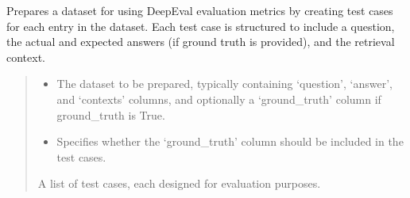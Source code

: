 \documentclass[letterpaper,10pt,english,openany,oneside]{sphinxmanual}
\begin{document}
\begin{fulllineitems}
\label{\detokenize{evaluation:tools.pipeline.deepeval_prepare_data}}
\pysigstartsignatures
{}
\pysigstopsignatures
\sphinxAtStartPar
Prepares a dataset for using DeepEval evaluation metrics by creating test cases for each entry in the dataset. 
Each test case is structured to include a question, the actual and expected answers (if ground truth is provided),
and the retrieval context.
\begin{quote}\begin{description}
\begin{itemize}
\item {} 
\sphinxAtStartPar
{} \textendash{} The dataset to be prepared, typically containing ‘question’, ‘answer’, and ‘contexts’ columns,
and optionally a ‘ground\_truth’ column if ground\_truth is True.

\item {} 
\sphinxAtStartPar
{} \textendash{} Specifies whether the ‘ground\_truth’ column should be included in the test cases.

\end{itemize}

\sphinxAtStartPar
A list of test cases, each designed for evaluation purposes.

\end{description}\end{quote}

\end{fulllineitems}

\end{document}
